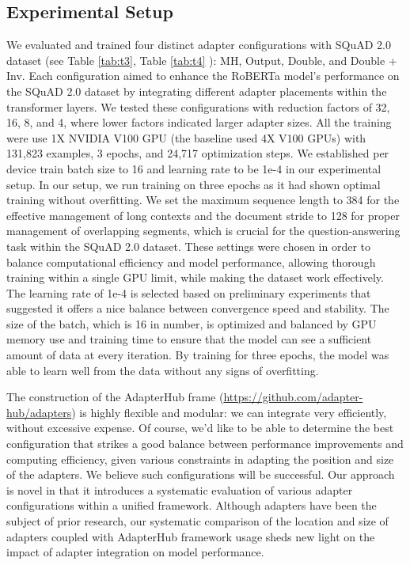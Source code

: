 \documentclass[conference]{IEEEtran}
\begin{document}
\subsection{Experimental Setup}


We evaluated and trained four distinct adapter configurations with SQuAD 2.0 dataset (see Table \ref{tab:t3}, Table \ref{tab:t4} ): MH, Output, Double, and Double + Inv. Each configuration aimed to enhance the RoBERTa model's performance on the SQuAD 2.0 dataset by integrating different adapter placements within the transformer layers. We tested these configurations with reduction factors of 32, 16, 8, and 4, where lower factors indicated larger adapter sizes. All the training were use 1X NVIDIA V100 GPU (the baseline used 4X V100 GPUs) with 131,823 examples, 3 epochs, and 24,717 optimization steps. 
We established per device train batch size to 16 and learning rate to be 1e-4 in our experimental setup. In our setup, we run training on three epochs as it had shown optimal training without overfitting. We set the maximum sequence length to 384 for the effective management of long contexts and the document stride to 128 for proper management of overlapping segments, which is crucial for the question-answering task within the SQuAD 2.0 dataset. These settings were chosen in order to balance computational efficiency and model performance, allowing thorough training within a single GPU limit, while making the dataset work effectively. The learning rate of 1e-4 is selected based on preliminary experiments that suggested it offers a nice balance between convergence speed and stability. The size of the batch, which is 16 in number, is optimized and balanced by GPU memory use and training time to ensure that the model can see a sufficient amount of data at every iteration. By training for three epochs, the model was able to learn well from the data without any signs of overfitting.

The construction of the AdapterHub frame (\url{https://github.com/adapter-hub/adapters}) is highly flexible and modular: we can integrate very efficiently, without excessive expense. Of course, we'd like to be able to determine the best configuration that strikes a good balance between performance improvements and computing efficiency, given various constraints in adapting the position and size of the adapters. We believe such configurations will be successful. Our approach is novel in that it introduces a systematic evaluation of various adapter configurations within a unified framework. Although adapters have been the subject of prior research, our systematic comparison of the location and size of adapters coupled with AdapterHub framework usage sheds new light on the impact of adapter integration on model performance. 
\end{document}
